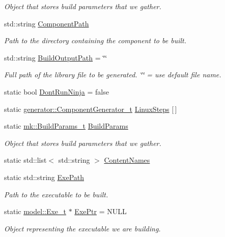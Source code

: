 \begin{DoxyCompactItemize}
\begin{DoxyCompactList}\small\item\em Object that stores build parameters that we gather. \end{DoxyCompactList}\item 
std\+::string \hyperlink{namespacecli_af06ed68e84cd1ff2ac4b02622b3a1889}{Component\+Path}
\begin{DoxyCompactList}\small\item\em Path to the directory containing the component to be built. \end{DoxyCompactList}\item 
std\+::string \hyperlink{namespacecli_aa5e0a473170e9417b3b9d5a2733b253e}{Build\+Output\+Path} = \char`\"{}\char`\"{}
\begin{DoxyCompactList}\small\item\em Full path of the library file to be generated. \char`\"{}\char`\"{} = use default file name. \end{DoxyCompactList}\item 
static bool \hyperlink{namespacecli_a9aa7b41991b7a654aeaad913f5a2c257}{Dont\+Run\+Ninja} = false
\item 
static \hyperlink{namespacegenerator_a51a9c405b080b56f182d2a9324a9325d}{generator\+::\+Component\+Generator\+\_\+t} \hyperlink{namespacecli_aa965937b0e79f800d22c09a21db1d6b0}{Linux\+Steps} \mbox{[}$\,$\mbox{]}
\item 
static \hyperlink{structmk_1_1_build_params__t}{mk\+::\+Build\+Params\+\_\+t} \hyperlink{namespacecli_a4b3f8be996a29096d321c822dd8a7521}{Build\+Params}
\begin{DoxyCompactList}\small\item\em Object that stores build parameters that we gather. \end{DoxyCompactList}\item 
static std\+::list$<$ std\+::string $>$ \hyperlink{namespacecli_af6c620daa149b352806b6d052b933ab4}{Content\+Names}
\item 
static std\+::string \hyperlink{namespacecli_a5281170d5e6e43095a9c168bc48694c2}{Exe\+Path}
\begin{DoxyCompactList}\small\item\em Path to the executable to be built. \end{DoxyCompactList}\item 
static \hyperlink{structmodel_1_1_exe__t}{model\+::\+Exe\+\_\+t} $\ast$ \hyperlink{namespacecli_a06731ece22b0ce727e879563be534c1f}{Exe\+Ptr} = N\+U\+LL
\begin{DoxyCompactList}\small\item\em Object representing the executable we are building. \end{DoxyCompactList}\item 

\end{DoxyCompactItemize}
